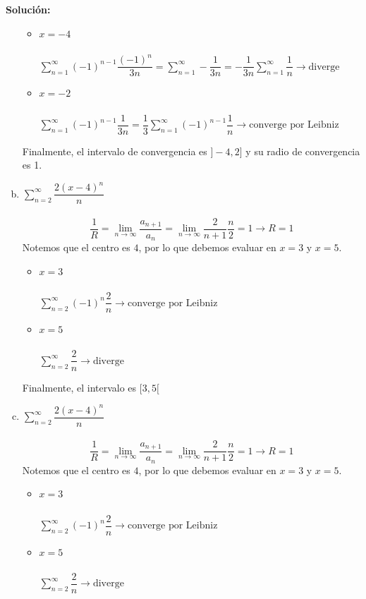 \documentclass[12pt]{article}
\newenvironment{solucion}
{\begin{mdframed}[backgroundcolor=black!10]
		{\bf Solución:}\\
	}
	{
	\end{mdframed}
}
\newenvironment{preguntas}
{\begin{enumerate}\itemsep12pt
	}
	{
	\end{enumerate}
}
\newcommand{\ra}{\rightarrow}
\begin{document}
\begin{preguntas}
\begin{solucion}
\begin{enumerate}[a)]
\begin{itemize}
	\item $x = -4$\\
	\\
	$\sum\limits_{n=1}^{\infty}(-1)^{n-1}\dfrac{(-1)^n}{3n}
	= \sum\limits_{n=1}^{\infty}-\dfrac{1}{3n} 
	= -\dfrac{1}{3n} \sum\limits_{n=1}^{\infty}\dfrac{1}{n} 
	\ra \text{diverge}
	$
	\item $x = -2$\\
	\\
	$\sum\limits_{n=1}^{\infty}(-1)^{n-1}\dfrac{1}{3n}
	= \dfrac{1}{3} \sum\limits_{n=1}^{\infty}(-1)^{n-1}\dfrac{1}{n}
	\ra \text{converge por Leibniz}
	$
\end{itemize}
Finalmente, el intervalo de convergencia es $]-4, 2]$ y su radio de convergencia es 1.
\item $\sum\limits_{n=2}^{\infty}\dfrac{2(x-4)^n}{n}$\\
\\
$$\dfrac{1}{R} = \lim\limits_{n \ra \infty} \dfrac{a_{n+1}}{a_n}
= \lim\limits_{n \ra \infty} \dfrac{2}{n+1}\dfrac{n}{2} = 1 \ra R = 1$$
Notemos que el centro es $4$, por lo que debemos evaluar en $x=3$ y $x=5$.
\begin{itemize}
	\item $x=3$\\
	\\
	$\sum\limits_{n=2}^{\infty}(-1)^n\dfrac{2}{n} \ra \text{converge por Leibniz}$	\item $x=5$\\
	\\
	$\sum\limits_{n=2}^{\infty}\dfrac{2}{n} \ra \text{diverge}$
\end{itemize}
Finalmente, el intervalo es $[3,5[$
\item $\sum\limits_{n=2}^{\infty}\dfrac{2(x-4)^n}{n}$\\
\\
$$\dfrac{1}{R} = \lim\limits_{n \ra \infty} \dfrac{a_{n+1}}{a_n}
= \lim\limits_{n \ra \infty} \dfrac{2}{n+1}\dfrac{n}{2} = 1 \ra R = 1$$
Notemos que el centro es $4$, por lo que debemos evaluar en $x=3$ y $x=5$.
\begin{itemize}
	\item $x=3$\\
	\\
	$\sum\limits_{n=2}^{\infty}(-1)^n\dfrac{2}{n} \ra \text{converge por Leibniz}$	\item $x=5$\\
	\\
	$\sum\limits_{n=2}^{\infty}\dfrac{2}{n} \ra \text{diverge}$

\end{itemize}
\end{enumerate}
\end{solucion}
\end{preguntas}
\end{document}
